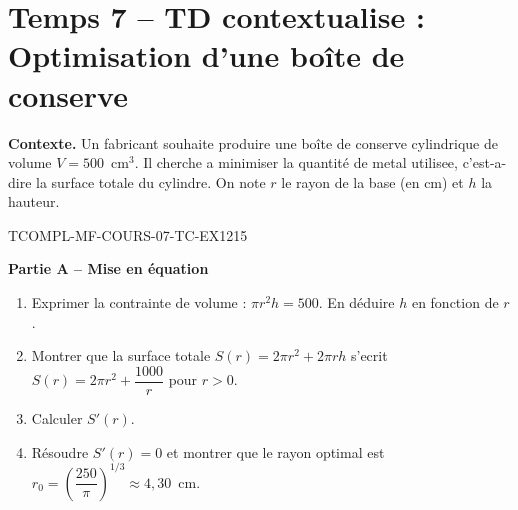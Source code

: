 

\section*{Temps 7 -- TD contextualise : Optimisation d'une boîte de conserve}

\textbf{Contexte.} Un fabricant souhaite produire une boîte de conserve cylindrique de volume $V = 500$~cm$^3$. Il cherche a minimiser la quantité de metal utilisee, c'est-a-dire la surface totale du cylindre. On note $r$ le rayon de la base (en cm) et $h$ la hauteur.

\bigskip


\begin{exercice}{TCOMPL-MF-COURS-07-TC-EX1}{2}{15}

\textbf{Partie A -- Mise en équation}

\begin{enumerate}
  \item Exprimer la contrainte de volume : $\pi r^2 h = 500$. En déduire $h$ en fonction de $r$.
  \item Montrer que la surface totale $S(r) = 2\pi r^2 + 2\pi r h$ s'ecrit $S(r) = 2\pi r^2 + \dfrac{1000}{r}$ pour $r > 0$.
  \item Calculer $S'(r)$.
  \item Résoudre $S'(r) = 0$ et montrer que le rayon optimal est $r_0 = \left(\dfrac{250}{\pi}\right)^{1/3} \approx 4{,}30$~cm.
\end{enumerate}

\end{exercice}

